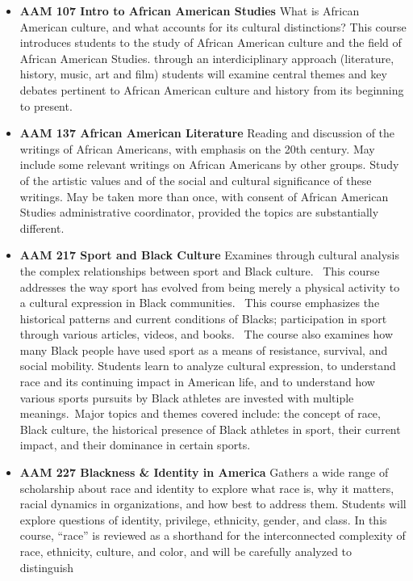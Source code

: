 \documentclass[
  letterpaper,
]{scrbook}
\providecommand{\tightlist}{%
  \setlength{\itemsep}{0pt}\setlength{\parskip}{0pt}}
\begin{document}
\begin{itemize}
\tightlist
\item
  \textbf{AAM 107 Intro to African American Studies} What is African
  American culture, and what accounts for its cultural distinctions?
  This course introduces students to the study of African American
  culture and the field of African American Studies. through an
  interdiciplinary approach (literature, history, music, art and film)
  students will examine central themes and key debates pertinent to
  African American culture and history from its beginning to present.
\item
  \textbf{AAM 137 African American Literature} Reading and discussion of
  the writings of African Americans, with emphasis on the 20th century.
  May include some relevant writings on African Americans by other
  groups. Study of the artistic values and of the social and cultural
  significance of these writings. May be taken more than once, with
  consent of African American Studies administrative coordinator,
  provided the topics are substantially different.
\item
  \textbf{AAM 217 Sport and Black Culture} Examines through cultural
  analysis the complex relationships between sport and Black culture.~
  This course addresses the way sport has evolved from being merely a
  physical activity to a cultural expression in Black communities.~ This
  course emphasizes the historical patterns and current conditions of
  Blacks; participation in sport through various articles, videos, and
  books.~ The course also examines how many Black people have used sport
  as a means of resistance, survival, and social mobility. Students
  learn to analyze cultural expression, to understand race and its
  continuing impact in American life, and to understand how various
  sports pursuits by Black athletes are invested with multiple
  meanings.~Major topics and themes covered include: the concept of
  race, Black culture, the historical presence of Black athletes in
  sport, their current impact, and their dominance in certain sports.
\item
  \textbf{AAM 227 Blackness \& Identity in America} Gathers a wide range
  of scholarship about race and identity to explore what race is, why it
  matters, racial dynamics in organizations, and how best to address
  them. Students will explore questions of identity, privilege,
  ethnicity, gender, and class. In this course, ``race'' is reviewed as
  a shorthand for the interconnected complexity of race, ethnicity,
  culture, and color, and will be carefully analyzed to distinguish

\end{itemize}
\end{document}
